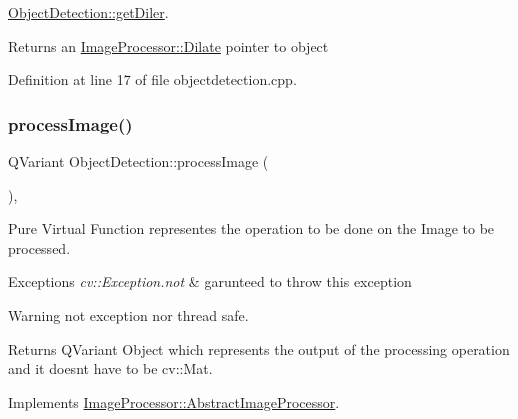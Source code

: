 \hyperlink{class_image_processor_1_1_object_detection_a2b5e3886ae9770e412cc4d21dfe031dd}{Object\+Detection\+::get\+Diler}. 

\begin{DoxyReturn}{Returns}
an \hyperlink{class_image_processor_1_1_dilate}{Image\+Processor\+::\+Dilate} pointer to object 
\end{DoxyReturn}


Definition at line 17 of file objectdetection.\+cpp.

\mbox{\label{class_image_processor_1_1_object_detection_ac5561650d95eac1672e2d049ed36201d}} 
\subsubsection{\texorpdfstring{process\+Image()}{processImage()}}
{\footnotesize\ttfamily Q\+Variant Object\+Detection\+::process\+Image (\begin{DoxyParamCaption}{ }\end{DoxyParamCaption})\hspace{0.3cm}{\ttfamily [override]}, {\ttfamily [virtual]}}



Pure Virtual Function representes the operation to be done on the Image to be processed. 


\begin{DoxyExceptions}{Exceptions}
{\em cv\+::\+Exception.\+not} & garunteed to throw this exception \\
\hline
\end{DoxyExceptions}
\begin{DoxyWarning}{Warning}
not exception nor thread safe. 
\end{DoxyWarning}
\begin{DoxyReturn}{Returns}
Q\+Variant Object which represents the output of the processing operation and it doesn\textquotesingle{}t have to be cv\+::\+Mat. 
\end{DoxyReturn}


Implements \hyperlink{class_image_processor_1_1_abstract_image_processor_ad033ae911918b0f6842b7b1d6cdd2b90}{Image\+Processor\+::\+Abstract\+Image\+Processor}.



